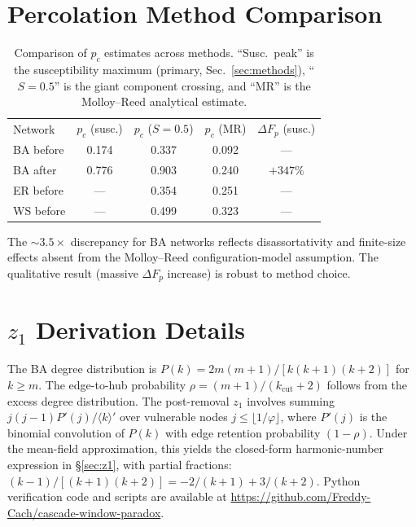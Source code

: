 \documentclass[aps,pre,twocolumn,superscriptaddress,showpacs]{revtex4-2}
\newcommand{\avg}[1]{\langle #1 \rangle}
\newcommand{\pc}{p_c}
\newcommand{\DF}{\Delta F}
\newcommand{\kcut}{k_{\text{cut}}}
\begin{document}
\appendix

\section{Percolation Method Comparison}
\label{app:percolation}

\begin{table}[h]
\caption{Comparison of $\pc$ estimates across methods. ``Susc.\ peak'' is the susceptibility maximum (primary, Sec.~\ref{sec:methods}), ``$S=0.5$'' is the giant component crossing, and ``MR'' is the Molloy--Reed analytical estimate.}
\label{tab:pc_compare}
\begin{ruledtabular}
\begin{tabular}{lcccc}
\textrm{Network} & $\pc$ (susc.) & $\pc$ ($S=0.5$) & $\pc$ (MR) & $\DF_p$ (susc.) \\
\colrule
BA before & 0.174 & 0.337 & 0.092 & --- \\
BA after & 0.776 & 0.903 & 0.240 & $+347\%$ \\
ER before & --- & 0.354 & 0.251 & --- \\
WS before & --- & 0.499 & 0.323 & --- \\
\end{tabular}
\end{ruledtabular}
\end{table}

The ${\sim}3.5\times$ discrepancy for BA networks reflects disassortativity and finite-size effects absent from the Molloy--Reed configuration-model assumption. The qualitative result (massive $\DF_p$ increase) is robust to method choice.

\section{$z_1$ Derivation Details}
\label{app:z1}

The BA degree distribution is $P(k) = 2m(m+1)/[k(k+1)(k+2)]$ for $k \geq m$. The edge-to-hub probability $\rho = (m+1)/(\kcut+2)$ follows from the excess degree distribution. The post-removal $z_1$ involves summing $j(j-1)P'(j)/\avg{k}'$ over vulnerable nodes $j \leq \lfloor 1/\varphi \rfloor$, where $P'(j)$ is the binomial convolution of $P(k)$ with edge retention probability $(1-\rho)$. Under the mean-field approximation, this yields the closed-form harmonic-number expression in \S\ref{sec:z1}, with partial fractions: $(k-1)/[(k+1)(k+2)] = -2/(k+1) + 3/(k+2)$. Python verification code and scripts are available at \url{https://github.com/Freddy-Cach/cascade-window-paradox}.
\end{document}
